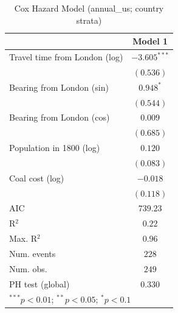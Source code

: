 
\begin{table}
\begin{center}
\begin{tabular}{l c}
\hline
 & Model 1 \\
\hline
Travel time from London (log) & $-3.605^{***}$ \\
 & $(0.536)$ \\
Bearing from London (sin) & $0.948^{*}$ \\
 & $(0.544)$ \\
Bearing from London (cos) & $0.009$ \\
 & $(0.685)$ \\
Population in 1800 (log) & $0.120$ \\
 & $(0.083)$ \\
Coal cost (log) & $-0.018$ \\
 & $(0.118)$ \\
\hline
AIC              & $739.23$ \\
R$^2$            & $0.22$ \\
Max. R$^2$       & $0.96$ \\
Num. events      & $228$ \\
Num. obs.        & $249$ \\
PH test (global) & $0.330$ \\
\hline
\multicolumn{2}{l}{\scriptsize{$^{***}p<0.01$; $^{**}p<0.05$; $^{*}p<0.1$}}
\end{tabular}
\caption{Cox Hazard Model (annual\_us; country strata)}
\label{tab:cox_serious_strata_annual_us}
\end{center}
\end{table}
